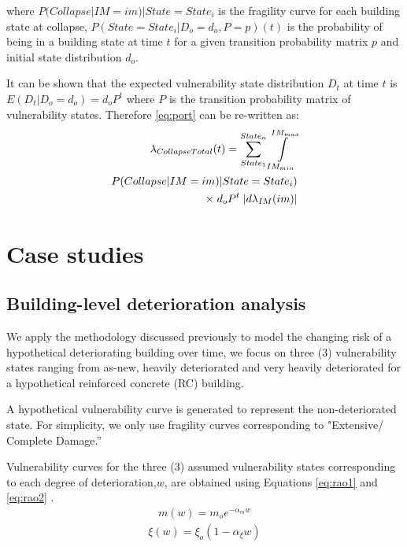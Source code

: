 where $P(Collapse |IM=im)| State=State_{i}$ is the fragility curve for each building state at collapse,  
$P(State=State_{i} |D_{o} =d_{o}, P=p)(t)$  is the probability of being in a building state at time $t$ for a given transition probability matrix $p$ and initial state distribution $d_{o}$.

It can be shown that the expected vulnerability state distribution $D_t$ at time $t$ is $E(D_t|D_o=d_o) = d_oP^t$ where $P$ is the transition probability matrix of vulnerability states. Therefore \ref{eq:port} can be re-written as:
\begin{equation}
\begin{split}
    \lambda_{Collapse Total}(t) = \sum_{State_{1}}^{State_{n}}\int\limits_{IM_{min}}^{IM_{max}}\\
    P(Collapse |IM=im)| State=State_{i}) \\
   \times \;  d_oP^t \; | d\lambda_{IM} (im) |
\end{split}
\label{eq:port2}
\end{equation}


\section{Case studies}

\subsection{Building-level deterioration analysis}

We apply the methodology discussed previously to model the changing risk of a hypothetical deteriorating building over time, we focus on three (3) vulnerability states ranging from as-new, heavily deteriorated and very heavily deteriorated for a hypothetical reinforced concrete (RC) building. 

A hypothetical vulnerability curve is generated to represent the non-deteriorated state. For simplicity, we only use fragility curves corresponding to "Extensive/ Complete Damage.”

Vulnerability curves for the three (3) assumed vulnerability states corresponding to each degree of deterioration,$w$, are obtained using Equations \ref{eq:rao1} and \ref{eq:rao2} \citep{rao2017development}. 
\begin{equation}
\begin{split}
    m(w) = m_{o}e^{-\alpha_{m}w}
\end{split}
\label{eq:rao1}
\end{equation}
\begin{equation}
\begin{split}
    \xi(w) = \xi_{o}(1-\alpha_{\xi}w)
\end{split}
\label{eq:rao2}
\end{equation}

